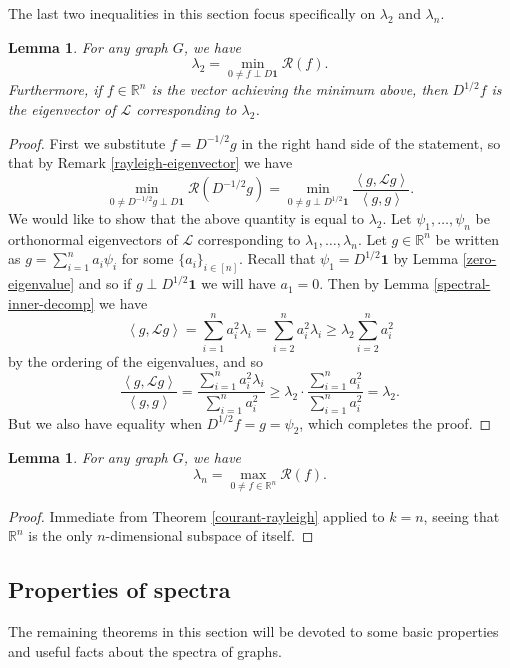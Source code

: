 \documentclass[a4paper,11pt]{article}
\newtheorem{lemma}[theorem]{Lemma}
\theoremstyle{definition}
\newcommand{\R}{\mathbb{R}}
\renewcommand{\L}{\mathcal{L}}
\newcommand{\rayleigh}[1]{\mathcal{R}\left(#1\right)}
\newcommand{\rayleighinner}[1]{\frac {\inner{#1}{\L #1}} {\inner{#1}{#1}} }
\newcommand{\inner}[2]{\left\langle #1, #2 \right\rangle}
\begin{document}
The last two inequalities in this section focus specifically on $\lambda_2$ and $\lambda_n$.

\begin{lemma}\label{second-eigenvalue-min}
For any graph $G$, we have
\[
\lambda_2 = \min_{0 \ne f \perp D\bm{1}} \rayleigh{f}.
\] Furthermore, if $f \in \R^n$ is the vector achieving the minimum above, then $D^{1/2}f$ is the eigenvector of $\L$ corresponding to $\lambda_2$.
\end{lemma}
\begin{proof}
First we substitute $f = D^{-1/2}g$ in the right hand side of the statement, so that by Remark \ref{rayleigh-eigenvector} we have
\[
\min_{0 \ne D^{-1/2}g \perp D\bm{1}} \rayleigh{D^{-1/2}g} = \min_{0 \ne g \perp D^{1/2}\bm{1}} \rayleighinner{g}.
\]
We would like to show that the above quantity is equal to $\lambda_2$. Let $\psi_1, \dots, \psi_n$ be orthonormal eigenvectors of $\L$ corresponding to $\lambda_1, \dots, \lambda_n$. Let $g \in \R^n$ be written as $g = \sum_{i=1}^n a_i \psi_i$ for some $\{a_i\}_{i \in [n]}$. Recall that $\psi_1 = D^{1/2}\bm{1}$ by Lemma \ref{zero-eigenvalue} and so if $g \perp D^{1/2}\bm{1}$ we will have $a_1 = 0$. Then by Lemma \ref{spectral-inner-decomp} we have
\[
\inner{g}{\L g} = \sum_{i=1}^n a_i^2 \lambda_i = \sum_{i=2}^n a_i^2 \lambda_i \ge \lambda_2 \sum_{i=2}^n a_i^2
\] by the ordering of the eigenvalues, and so
\[
\rayleighinner{g} = \frac{\sum_{i=1}^n a_i^2 \lambda_i}{\sum_{i=1}^n a_i^2}\ge \lambda_2 \cdot \frac{\sum_{i=1}^n a_i^2}{\sum_{i=1}^n a_i^2} = \lambda_2.
\]
But we also have equality when $D^{1/2}f = g = \psi_2$, which completes the proof.
\end{proof}

\begin{lemma}\label{lambda-n-max}
For any graph $G$, we have
\[
\lambda_n = \max_{0 \ne f \in \R^n} \rayleigh{f}.
\]
\end{lemma}
\begin{proof}
Immediate from Theorem \ref{courant-rayleigh} applied to $k = n$, seeing that $\R^n$ is the only $n$-dimensional subspace of itself.
\end{proof}

\subsection{Properties of spectra}

The remaining theorems in this section will be devoted to some basic properties and useful facts about the spectra of graphs.
\end{document}
